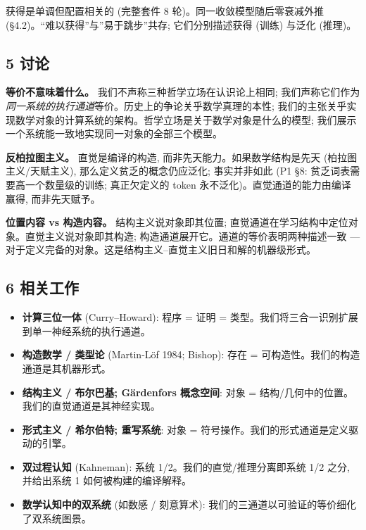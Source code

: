 \documentclass[
]{article}
\providecommand{\tightlist}{%
  \setlength{\itemsep}{0pt}\setlength{\parskip}{0pt}}
\begin{document}
获得是单调但配置相关的 (完整套件 8 轮)。同一收敛模型随后零衰减外推
(§4.2)。``难以获得''与''易于跳步''共存; 它们分别描述获得 (训练) 与泛化
(推理)。

\subsection{5 讨论}\label{ux8ba8ux8bba}

\textbf{等价不意味着什么。} 我们不声称三种哲学立场在认识论上相同;
我们声称它们作为\emph{同一系统的执行通道}等价。历史上的争论关乎数学真理的本性;
我们的主张关乎实现数学对象的计算系统的架构。哲学立场是关于数学对象是什么的模型;
我们展示一个系统能一致地实现同一对象的全部三个模型。

\textbf{反柏拉图主义。} 直觉是编译的构造,
而非先天能力。如果数学结构是先天 (柏拉图主义/天赋主义),
那么定义贫乏的概念仍应泛化; 事实并非如此 (P1 §8:
贫乏词表需要高一个数量级的训练; 真正欠定义的 token
永不泛化)。直觉通道的能力由编译赢得, 而非先天赋予。

\textbf{位置内容 vs 构造内容。} 结构主义说对象即其位置;
直觉通道在学习结构中定位对象。直觉主义说对象即其构造;
构造通道展开它。通道的等价表明两种描述一致 ---
对于定义完备的对象。这是结构主义--直觉主义旧日和解的机器级形式。

\subsection{6 相关工作}\label{ux76f8ux5173ux5de5ux4f5c}

\begin{itemize}
\tightlist
\item
  \textbf{计算三位一体} (Curry--Howard): 程序 = 证明 =
  类型。我们将三合一识别扩展到单一神经系统的执行通道。
\item
  \textbf{构造数学 / 类型论} (Martin-Löf 1984; Bishop): 存在 =
  可构造性。我们的构造通道是其机器形式。
\item
  \textbf{结构主义 / 布尔巴基; Gärdenfors 概念空间}: 对象 =
  结构/几何中的位置。我们的直觉通道是其神经实现。
\item
  \textbf{形式主义 / 希尔伯特; 重写系统}: 对象 =
  符号操作。我们的形式通道是定义驱动的引擎。
\item
  \textbf{双过程认知} (Kahneman): 系统 1/2。我们的直觉/推理分离即系统
  1/2 之分, 并给出系统 1 如何被构建的编译解释。
\item
  \textbf{数学认知中的双系统} (如数感 / 刻意算术):
  我们的三通道以可验证的等价细化了双系统图景。
\end{itemize}
\end{document}
